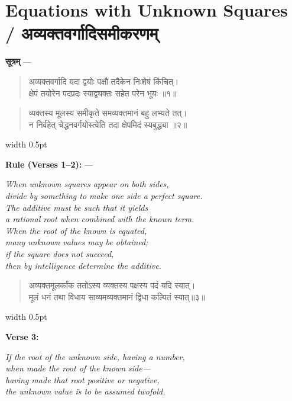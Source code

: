 \documentclass[11pt,a4paper]{article}
\newcommand{\vs}{\vspace{0.5em}}
\newenvironment{sanskritverse}{%
  \begin{quote}\devanagarifont\textcolor{versecolor}%
}{%
  \end{quote}
}
\newcommand{\bilingual}[2]{%
  \par\vspace{0.5em}%
  \noindent\begin{minipage}[t]{0.47\textwidth}%
  \setlength{\parindent}{0pt}%
  \small #1%
  \end{minipage}%
  \hfill\textcolor{columnrule}{\vrule width 0.5pt}\hfill%
  \begin{minipage}[t]{0.47\textwidth}%
  \setlength{\parindent}{0pt}%
  \small\raggedright #2%
  \end{minipage}%
  \par\vspace{0.5em}%
}
\begin{document}
\newpage

\section*{Equations with Unknown Squares / अव्यक्तवर्गादिसमीकरणम्}

\bilingual{\textbf{सूत्रम्} —
\begin{sanskritverse}
अव्यक्तवर्गादि यदा द्वयोः पक्षौ तदैकेन निःशेषं किंचित्।\\
क्षेपं तयोरेन पदप्रदः स्याद्व्यक्तः सहेत परेन भूयः ॥१॥
\end{sanskritverse}
\begin{sanskritverse}
व्यक्तस्य मूलस्य समीकृते समव्यक्तमानं बहु लभ्यते तत्।\\
न निर्वहेत् चेद्धनवर्गयोस्त्वेति तदा क्षेपमिदं स्यबुद्ध्या ॥२॥
\end{sanskritverse}
}{%
\textbf{Rule (Verses 1--2):} ---
\begin{flushright}
\textit{When unknown squares appear on both sides,}\\
\textit{divide by something to make one side a perfect square.}\\
\textit{The additive must be such that it yields}\\
\textit{a rational root when combined with the known term.}\\[0.5em]
\textit{When the root of the known is equated,}\\
\textit{many unknown values may be obtained;}\\
\textit{if the square does not succeed,}\\
\textit{then by intelligence determine the additive.}
\end{flushright}}

\vs

\bilingual{\begin{sanskritverse}
अव्यक्तमूलर्कांक ततोऽस्य व्यक्तस्य पक्षस्य पदं यदि स्यात्।\\
मूलं धनं तथा विधाय साव्यमव्यक्तमानं द्विधा कल्पितं स्यात्॥३॥
\end{sanskritverse}
}{%
\textbf{Verse 3:}
\begin{flushright}
\textit{If the root of the unknown side, having a number,}\\
\textit{when made the root of the known side---}\\
\textit{having made that root positive or negative,}\\
\textit{the unknown value is to be assumed twofold.}
\end{flushright}}
\end{document}

